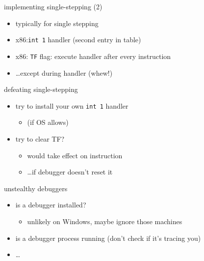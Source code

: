 \begin{frame}[fragile,label=implSingleStepB]{implementing single-stepping (2)}
\lstset{language=myasm,style=small}
    \begin{itemize}
    \item typically  for single stepping
    \item x86:{\tt int 1} handler (second entry in table)
    \item x86: {\tt TF} flag: execute handler after every instruction
    \item \ldots except during handler (whew!)
    \end{itemize}
\end{frame}

\begin{frame}[fragile,label=defeatSingleStep]{defeating single-stepping}
    \begin{itemize}
    \item try to install your own {\tt int 1} handler
        \begin{itemize}
        \item (if OS allows)
        \end{itemize}
    \item try to clear TF?
        \begin{itemize}
        \item would take effect on  instruction
        \item \ldots if debugger doesn't reset it
        \end{itemize}
    \end{itemize}
\end{frame}


\begin{frame}[fragile,label=unstealthyDebuggers]{unstealthy debuggers}
    \begin{itemize}
    \item is a debugger installed?
        \begin{itemize}
        \item unlikely on Windows, maybe ignore those machines
        \end{itemize}
    \item is a debugger process running (don't check if it's tracing you)
    \item \ldots
    \end{itemize}
\end{frame}

